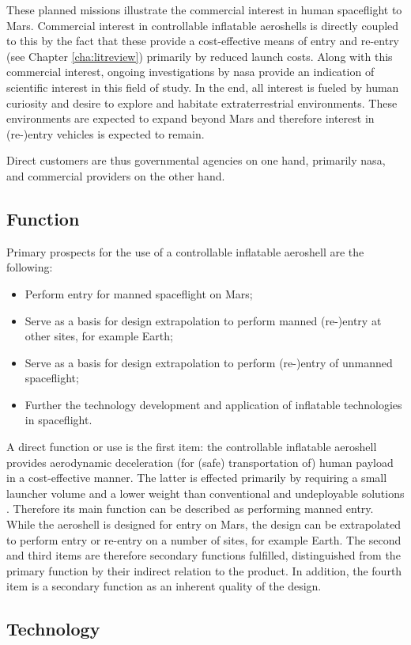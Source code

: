 These planned missions illustrate the commercial interest in human spaceflight to Mars. Commercial interest in controllable inflatable aeroshells is directly coupled to this by the fact that these provide a cost-effective means of entry and re-entry (see Chapter \ref{cha:litreview}) primarily by reduced launch costs. Along with this commercial interest, ongoing investigations by \gls{nasa} provide an indication of scientific interest in this field of study. In the end, all interest is fueled by human curiosity and desire to explore and habitate extraterrestrial environments. These environments are expected to expand beyond Mars and therefore interest in (re-)entry vehicles is expected to remain.

Direct customers are thus governmental agencies on one hand, primarily \gls{nasa}, and commercial providers on the other hand. 

\subsection{Function}
Primary prospects for the use of a controllable inflatable aeroshell are the following:
\begin{itemize}
\item Perform entry for manned spaceflight on Mars;
\item Serve as a basis for design extrapolation to perform manned (re-)entry at other sites, for example Earth;
\item Serve as a basis for design extrapolation to perform (re-)entry of unmanned spaceflight;
\item Further the technology development and application of inflatable technologies in spaceflight.
\end{itemize}
A direct function or use is the first item: the controllable inflatable aeroshell provides aerodynamic deceleration (for (safe) transportation of) human payload in a cost-effective manner. The latter is effected primarily by requiring a small launcher volume and a lower weight than conventional and undeployable solutions \cite{Hughes2005, Cianciolo2010}. Therefore its main function can be described as performing manned entry. While the aeroshell is designed for entry on Mars, the design can be extrapolated to perform entry or re-entry on a number of sites, for example Earth. The second and third items are therefore secondary functions fulfilled, distinguished from the primary function by their indirect relation to the product. In addition, the fourth item is a secondary function as an inherent quality of the design.

\subsection{Technology}




